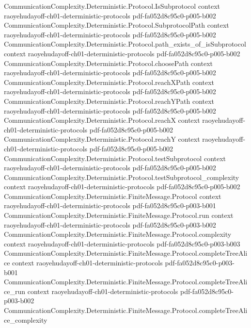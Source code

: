 \begin{theorem}
  {CommunicationComplexity.Deterministic.Protocol.IsSubprotocol}
  {context}
  {raoyehudayoff-ch01-deterministic-protocols}
  {pdf-fa052d8c95c0-p005-b002}
\proofstep
  {CommunicationComplexity.Deterministic.Protocol.SubprotocolPath}
  {context}
  {raoyehudayoff-ch01-deterministic-protocols}
  {pdf-fa052d8c95c0-p005-b002}
\proofstep
  {CommunicationComplexity.Deterministic.Protocol.path_exists_of_isSubprotocol}
  {context}
  {raoyehudayoff-ch01-deterministic-protocols}
  {pdf-fa052d8c95c0-p005-b002}
\proofstep
  {CommunicationComplexity.Deterministic.Protocol.choosePath}
  {context}
  {raoyehudayoff-ch01-deterministic-protocols}
  {pdf-fa052d8c95c0-p005-b002}
\proofstep
  {CommunicationComplexity.Deterministic.Protocol.reachXPath}
  {context}
  {raoyehudayoff-ch01-deterministic-protocols}
  {pdf-fa052d8c95c0-p005-b002}
\proofstep
  {CommunicationComplexity.Deterministic.Protocol.reachYPath}
  {context}
  {raoyehudayoff-ch01-deterministic-protocols}
  {pdf-fa052d8c95c0-p005-b002}
\proofstep
  {CommunicationComplexity.Deterministic.Protocol.reachX}
  {context}
  {raoyehudayoff-ch01-deterministic-protocols}
  {pdf-fa052d8c95c0-p005-b002}
\proofstep
  {CommunicationComplexity.Deterministic.Protocol.reachY}
  {context}
  {raoyehudayoff-ch01-deterministic-protocols}
  {pdf-fa052d8c95c0-p005-b002}
\proofstep
  {CommunicationComplexity.Deterministic.Protocol.testSubprotocol}
  {context}
  {raoyehudayoff-ch01-deterministic-protocols}
  {pdf-fa052d8c95c0-p005-b002}
\proofstep
  {CommunicationComplexity.Deterministic.Protocol.testSubprotocol_complexity}
  {context}
  {raoyehudayoff-ch01-deterministic-protocols}
  {pdf-fa052d8c95c0-p005-b002}
\proofstep
  {CommunicationComplexity.Deterministic.FiniteMessage.Protocol}
  {context}
  {raoyehudayoff-ch01-deterministic-protocols}
  {pdf-fa052d8c95c0-p003-b001}
\proofstep
  {CommunicationComplexity.Deterministic.FiniteMessage.Protocol.run}
  {context}
  {raoyehudayoff-ch01-deterministic-protocols}
  {pdf-fa052d8c95c0-p003-b002}
\proofstep
  {CommunicationComplexity.Deterministic.FiniteMessage.Protocol.complexity}
  {context}
  {raoyehudayoff-ch01-deterministic-protocols}
  {pdf-fa052d8c95c0-p003-b003}
\proofstep
  {CommunicationComplexity.Deterministic.FiniteMessage.Protocol.completeTreeAlice}
  {context}
  {raoyehudayoff-ch01-deterministic-protocols}
  {pdf-fa052d8c95c0-p003-b001}
\proofstep
  {CommunicationComplexity.Deterministic.FiniteMessage.Protocol.completeTreeAlice_run}
  {context}
  {raoyehudayoff-ch01-deterministic-protocols}
  {pdf-fa052d8c95c0-p003-b002}
\proofstep
  {CommunicationComplexity.Deterministic.FiniteMessage.Protocol.completeTreeAlice_complexity}

\end{theorem}
